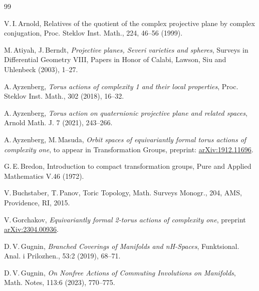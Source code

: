 \documentclass[english, 12pt]{amsproc}
\numberwithin{equation}{section}
\theoremstyle{plain}
\theoremstyle{definition}
\theoremstyle{remark}
\begin{document}
\begin{thebibliography}{99}

    V.\,I.\,Arnold, Relatives of the quotient of the complex projective plane by complex conjugation, Proc. Steklov Inst. Math., 224, 46--56 (1999).

 M.\,Atiyah, J.\,Berndt, \textit{Projective planes, Severi varieties and spheres}, Surveys in Differential Geometry VIII, Papers in Honor of Calabi, Lawson, Siu and Uhlenbeck (2003), 1--27.

 A.\,Ayzenberg, \textit{Torus actions of complexity 1 and their local properties}, Proc. Steklov Inst. Math., 302 (2018), 16--32.

 A.\,Ayzenberg, \textit{Torus action on quaternionic projective plane and related spaces}, Arnold Math. J. 7 (2021), 243--266.

 A.\,Ayzenberg, M.\,Masuda, \textit{Orbit spaces of equivariantly formal torus actions of complexity one}, to appear in Transformation Groups, preprint: \href{https://arxiv.org/abs/1912.11696}{arXiv:1912.11696}.

 G.\,E.\,Bredon, Introduction to compact transformation groups, Pure and Applied Mathematics V.46 (1972). %

 V.\,Buchstaber, T.\,Panov, Toric Topology, Math. Surveys Monogr., 204, AMS, Providence, RI, 2015.

 V.\,Gorchakov, \textit{Equivariantly formal 2-torus actions of complexity one}, preprint \href{https://arxiv.org/abs/2304.00936}{arXiv:2304.00936}.

 D.\,V.\,Gugnin, \textit{Branched Coverings of Manifolds and nH-Spaces}, Funktsional. Anal. i Prilozhen., 53:2 (2019), 68--71.

 D.\,V.\,Gugnin, \textit{On Nonfree Actions of Commuting Involutions on Manifolds}, Math. Notes, 113:6 (2023), 770--775.


\end{thebibliography}
\end{document}
